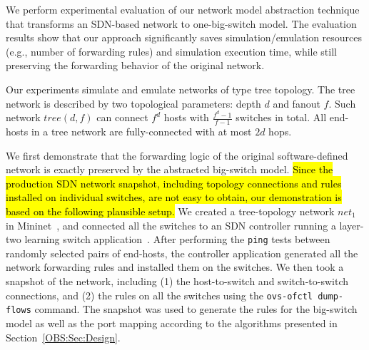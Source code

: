 \label{OBS:SubSec:PreserveForwardingLogic}
We perform experimental evaluation of our network model abstraction technique
that transforms an SDN-based network to one-big-switch model.
The evaluation results show that our approach significantly saves simulation/emulation resources
(e.g., number of forwarding rules) and simulation execution time,
while still preserving the forwarding behavior of the original network.

Our experiments simulate and emulate networks of type tree topology.
The tree network is described by two topological parameters: depth $d$ and fanout $f$.
Such network $tree(d, f)$ can connect $f^d$ hosts with $\frac{f^d - 1}{f-1}$ switches in total.
All end-hosts in a tree network are fully-connected with at most $2d$ hops.


We first demonstrate that the forwarding logic of the original software-defined network is exactly preserved by the abstracted big-switch model.
\hl{
    Since the production SDN network snapshot, including topology connections and rules installed on
individual switches, are not easy to obtain, our demonstration is based on the following plausible setup.
}
\fi
We created a tree-topology network $net_1$ in Mininet~\cite{Mininet},
and connected all the switches to an SDN controller running a layer-two learning switch application~\cite{Pox}.
After performing the \texttt{ping} tests between randomly selected pairs of end-hosts,
the controller application generated all the network forwarding rules and installed them on the switches.
We then took a snapshot of the network, including (1) the host-to-switch and switch-to-switch connections,
and (2) the rules on all the switches using the \texttt{ovs-ofctl dump-flows} command. The snapshot was used to generate the rules for the big-switch model as well as the port mapping according to the algorithms presented in Section~\ref{OBS:Sec:Design}.

